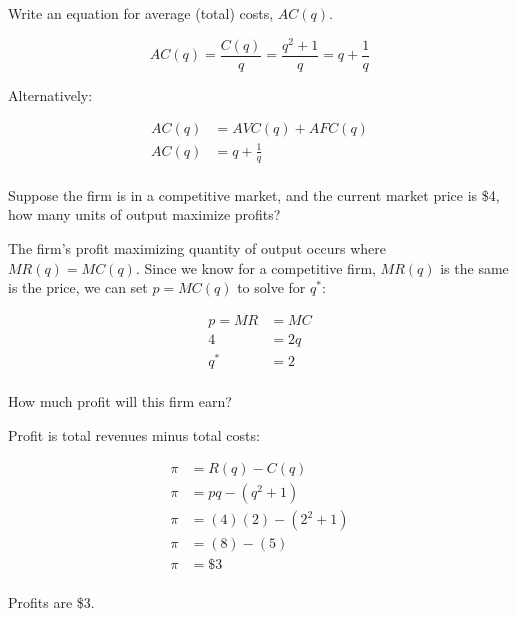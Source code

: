 \documentclass[12 pt]{exam}
\begin{document}
\begin{questions}
\begin{solution}
\end{solution}
	
\question Write an equation for average (total) costs, $AC(q)$.

\begin{solution}

\begin{equation*}
AC(q)=\frac{C(q)}{q}=\frac{q^2+1}{q}=q+\frac{1}{q}
\end{equation*}

Alternatively:

$$\begin{aligned}
AC(q)&=AVC(q)+AFC(q)\\
AC(q)&=q+\frac{1}{q}\\	
\end{aligned}$$

\end{solution}

\question Suppose the firm is in a competitive market, and the current market price is \$4, how many units of output maximize profits?

\begin{solution}

The firm's profit maximizing quantity of output occurs where $MR(q)=MC(q)$. Since we know for a competitive firm, $MR(q)$ is the same is the price, we can set $p=MC(q)$ to solve for $q^*$: 

$$\begin{aligned}
	p=MR&=MC\\
	4&=2q\\
	q^*&=2 \\
\end{aligned}$$

\end{solution}

\clearpage 

\question How much profit will this firm earn?

\begin{solution}
Profit is total revenues minus total costs:

$$\begin{aligned}
	\pi &= R(q)-C(q)\\
	\pi &= pq-(q^2+1)	\\
	\pi &= (4)(2)-(2^2 + 1)	\\
	\pi &= (8)-(5)\\
	\pi &= \$3\\
\end{aligned}$$

Profits are \$3.
	

\end{solution}
\end{questions}
\end{document}
